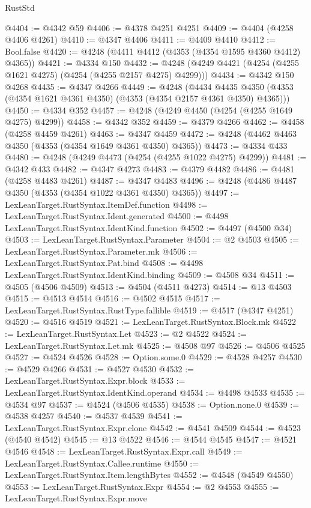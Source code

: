 \begin{lexlean}{RustStd}
\begin{coremodule}
@4404 := @4342 @59
@4406 := @4378 @4251 @4251
@4409 := @4404 (@4258 @4406 @4261)
@4410 := @4347 @4406
@4411 := @4409 @4410
@4412 := Bool.false
@4420 := @4248 (@4411 @4412 (@4353 (@4354 @1595 @4360 @4412) @4365))
@4421 := @4334 @150
@4432 := @4248 (@4249 @4421 (@4254 (@4255 @1621 @4275) (@4254 (@4255 @2157 @4275) @4299)))
@4434 := @4342 @150 @4268
@4435 := @4347 @4266
@4449 := @4248
    (@4434 @4435 @4350 (@4353 (@4354 @1621 @4361 @4350) (@4353 (@4354 @2157 @4361 @4350) @4365)))
@4450 := @4334 @352
@4457 := @4248 (@4249 @4450 (@4254 (@4255 @1649 @4275) @4299))
@4458 := @4342 @352
@4459 := @4379 @4266
@4462 := @4458 (@4258 @4459 @4261)
@4463 := @4347 @4459
@4472 := @4248 (@4462 @4463 @4350 (@4353 (@4354 @1649 @4361 @4350) @4365))
@4473 := @4334 @433
@4480 := @4248 (@4249 @4473 (@4254 (@4255 @1022 @4275) @4299))
@4481 := @4342 @433
@4482 := @4347 @4273
@4483 := @4379 @4482
@4486 := @4481 (@4258 @4483 @4261)
@4487 := @4347 @4483
@4496 := @4248 (@4486 @4487 @4350 (@4353 (@4354 @1022 @4361 @4350) @4365))
@4497 := LexLeanTarget.RustSyntax.ItemDef.function
@4498 := LexLeanTarget.RustSyntax.Ident.generated
@4500 := @4498 LexLeanTarget.RustSyntax.IdentKind.function
@4502 := @4497 (@4500 @34)
@4503 := LexLeanTarget.RustSyntax.Parameter
@4504 := @2 @4503
@4505 := LexLeanTarget.RustSyntax.Parameter.mk
@4506 := LexLeanTarget.RustSyntax.Pat.bind
@4508 := @4498 LexLeanTarget.RustSyntax.IdentKind.binding
@4509 := @4508 @34
@4511 := @4505 (@4506 @4509)
@4513 := @4504 (@4511 @4273)
@4514 := @13 @4503
@4515 := @4513 @4514
@4516 := @4502 @4515
@4517 := LexLeanTarget.RustSyntax.RustType.fallible
@4519 := @4517 (@4347 @4251)
@4520 := @4516 @4519
@4521 := LexLeanTarget.RustSyntax.Block.mk
@4522 := LexLeanTarget.RustSyntax.Let
@4523 := @2 @4522
@4524 := LexLeanTarget.RustSyntax.Let.mk
@4525 := @4508 @97
@4526 := @4506 @4525
@4527 := @4524 @4526
@4528 := Option.some.{0}
@4529 := @4528 @4257
@4530 := @4529 @4266
@4531 := @4527 @4530
@4532 := LexLeanTarget.RustSyntax.Expr.block
@4533 := LexLeanTarget.RustSyntax.IdentKind.operand
@4534 := @4498 @4533
@4535 := @4534 @97
@4537 := @4524 (@4506 @4535)
@4538 := Option.none.{0}
@4539 := @4538 @4257
@4540 := @4537 @4539
@4541 := LexLeanTarget.RustSyntax.Expr.clone
@4542 := @4541 @4509
@4544 := @4523 (@4540 @4542)
@4545 := @13 @4522
@4546 := @4544 @4545
@4547 := @4521 @4546
@4548 := LexLeanTarget.RustSyntax.Expr.call
@4549 := LexLeanTarget.RustSyntax.Callee.runtime
@4550 := LexLeanTarget.RustSyntax.Item.lengthBytes
@4552 := @4548 (@4549 @4550)
@4553 := LexLeanTarget.RustSyntax.Expr
@4554 := @2 @4553
@4555 := LexLeanTarget.RustSyntax.Expr.move

\end{coremodule}
\end{lexlean}
